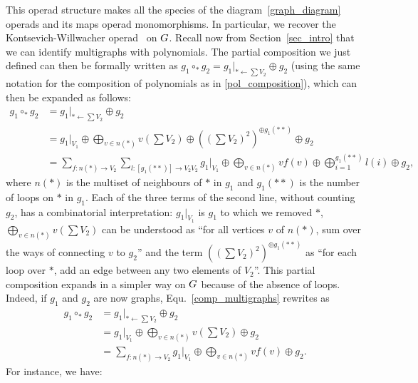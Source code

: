 \documentclass[11pt]{article}
\theoremstyle{definition}
\numberwithin{equation}{section}
\newcommand{\take}{\leftarrow}
\newcommand{\spe}[1]{\normalfont{\textsc{#1}}}
\newcommand{\comp}[1][\ast]{\circ_{#1}}
\newcommand{\G}{\spe{G}}
\begin{document}
This operad structure makes all the species of the diagram~\ref{graph_diagram} operads and its maps operad 
monomorphisms. In particular, we recover the Kontsevich-Willwacher operad~\cite{MV19} on $\G$. Recall now 
from Section~\ref{sec_intro} that we can identify multigraphs with polynomials. The partial composition we 
just defined can then be formally written as $g_1\comp g_2 = g_1|_{\ast \take \sum V_2}\oplus g_2$
(using the same notation for the composition of polynomials as in \eqref{pol_composition}), which can then 
be expanded as follows:
\begin{equation}\begin{split}\label{comp_multigraphs}
    g_1\comp g_2 &= g_1|_{\ast \take \sum V_2}\oplus g_2\\
    &= g_1|_{V_1} \oplus\bigoplus_{v\in n(\ast)} v(\sum V_2)\oplus((\sum V_2)^2)^{\oplus g_1(\ast\ast)}\oplus g_2 \\
    &= \sum_{f:n(\ast)\to V_2}\sum_{l:[g_1(\ast\ast)]\to V_2V_2} g_1|_{V_1}\oplus\bigoplus_{v\in n(\ast)}vf(v)\oplus\bigoplus_{i=1}^{g_1(\ast\ast)}l(i) \oplus g_2,
\end{split}\end{equation}
where $n(\ast)$ is the multiset of neighbours of $\ast$ in $g_1$ and $g_1(\ast\ast)$ is the number of loops on 
$\ast$ in $g_1$. Each of the three terms of the second line, without counting $g_2$, has a combinatorial 
interpretation: $g_1|_{V_1}$ is $g_1$ to which we removed $\ast$, $\bigoplus_{v\in n(\ast)} v(\sum V_2)$
can be understood as ``for all vertices $v$ of $n(\ast)$, sum over the ways of connecting $v$ to $g_2$'' 
and the term $((\sum V_2)^2)^{\oplus g_1(\ast\ast)}$ as ``for each loop over $\ast$, add an edge between 
any two elements of $V_2$''. This partial composition expands in a simpler way on $\G$ because of the 
absence of loops. Indeed, if $g_1$ and $g_2$ are now graphs, Equ.~\eqref{comp_multigraphs} rewrites as
\begin{equation}\begin{split}
    g_1\comp g_2 &= g_1|_{\ast \take \sum V_2}\oplus g_2\\
    &= g_1|_{V_1} \oplus\bigoplus_{v\in n(\ast)} v(\sum V_2)\oplus g_2 \\
    &= \sum_{f:n(\ast)\rightarrow V_2} g_1|_{V_1}\oplus\bigoplus_{v\in n(\ast)}vf(v)\oplus g_2.
\end{split}\end{equation}
For instance, we have:
\end{document}
